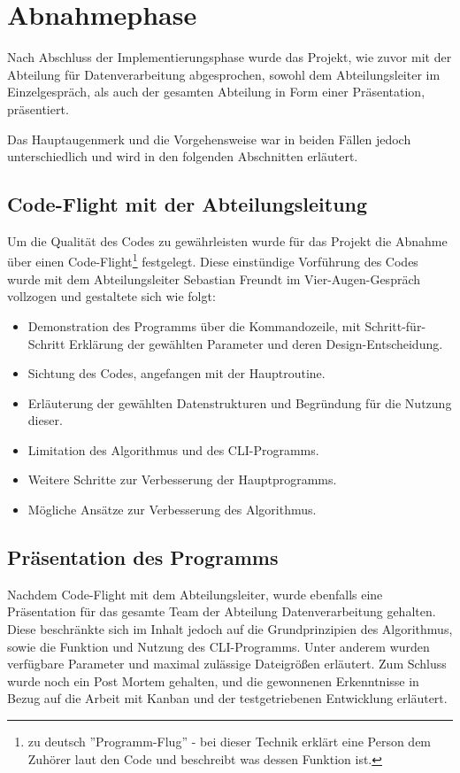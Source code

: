 \section{Abnahmephase}
\label{section:abnahmephase}
Nach Abschluss der Implementierungsphase wurde das Projekt, wie zuvor mit der
Abteilung für Datenverarbeitung abgesprochen, sowohl dem Abteilungsleiter im Einzelgespräch,
als auch der gesamten Abteilung in Form einer Präsentation, präsentiert.

Das Hauptaugenmerk und die Vorgehensweise war in beiden Fällen jedoch unterschiedlich
und wird in den folgenden Abschnitten erläutert.

\subsection{Code-Flight mit der Abteilungsleitung}

Um die Qualität des Codes zu gewährleisten wurde für das Projekt die Abnahme über einen Code-Flight\footnote{zu deutsch ''Programm-Flug'' - bei dieser Technik erklärt eine Person dem Zuhörer laut den Code und beschreibt was dessen Funktion ist.} festgelegt. Diese einstündige
Vorführung des Codes wurde mit dem Abteilungsleiter Sebastian Freundt im
Vier-Augen-Gespräch vollzogen und gestaltete sich wie folgt:

\begin{itemize}
    \item Demonstration des Programms über die Kommandozeile, mit Schritt-für-Schritt Erklärung der gewählten Parameter und deren Design-Entscheidung.
    \item Sichtung des Codes, angefangen mit der Hauptroutine.
    \item Erläuterung der gewählten Datenstrukturen und Begründung für die Nutzung dieser.
    \item Limitation des Algorithmus und des CLI-Programms.
    \item Weitere Schritte zur Verbesserung der Hauptprogramms.
    \item Mögliche Ansätze zur Verbesserung des Algorithmus.
\end{itemize}

\subsection{Präsentation des Programms}

Nachdem Code-Flight mit dem Abteilungsleiter, wurde ebenfalls
eine Präsentation für das gesamte Team der Abteilung Datenverarbeitung gehalten.
Diese beschränkte sich im Inhalt jedoch auf die Grundprinzipien des Algorithmus, sowie
die Funktion und Nutzung des CLI-Programms. Unter anderem wurden verfügbare
Parameter und maximal zulässige Dateigrößen erläutert.
Zum Schluss wurde noch ein Post Mortem gehalten, und die gewonnenen Erkenntnisse in Bezug auf die Arbeit mit Kanban und der testgetriebenen Entwicklung erläutert.